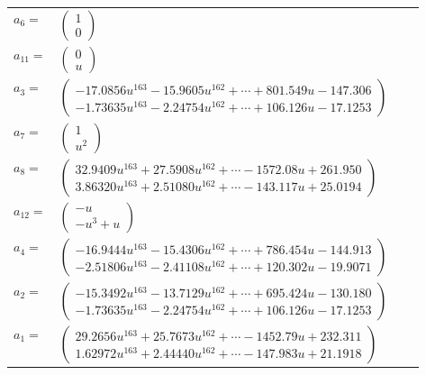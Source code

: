 \documentclass[1p]{elsarticle_modified}
\theoremstyle{definition}
\begin{document}
\begin{tabular}{m{7pt} m{180pt} m{7pt} m{180pt} }
\flushright $a_{6}=$&$\begin{pmatrix}1\\0\end{pmatrix}$ \\
\flushright $a_{11}=$&$\begin{pmatrix}0\\u\end{pmatrix}$ \\
\flushright $a_{3}=$&$\begin{pmatrix}-17.0856 u^{163}-15.9605 u^{162}+\cdots+801.549 u-147.306\\-1.73635 u^{163}-2.24754 u^{162}+\cdots+106.126 u-17.1253\end{pmatrix}$ \\
\flushright $a_{7}=$&$\begin{pmatrix}1\\u^2\end{pmatrix}$ \\
\flushright $a_{8}=$&$\begin{pmatrix}32.9409 u^{163}+27.5908 u^{162}+\cdots-1572.08 u+261.950\\3.86320 u^{163}+2.51080 u^{162}+\cdots-143.117 u+25.0194\end{pmatrix}$ \\
\flushright $a_{12}=$&$\begin{pmatrix}- u\\- u^3+u\end{pmatrix}$ \\
\flushright $a_{4}=$&$\begin{pmatrix}-16.9444 u^{163}-15.4306 u^{162}+\cdots+786.454 u-144.913\\-2.51806 u^{163}-2.41108 u^{162}+\cdots+120.302 u-19.9071\end{pmatrix}$ \\
\flushright $a_{2}=$&$\begin{pmatrix}-15.3492 u^{163}-13.7129 u^{162}+\cdots+695.424 u-130.180\\-1.73635 u^{163}-2.24754 u^{162}+\cdots+106.126 u-17.1253\end{pmatrix}$ \\
\flushright $a_{1}=$&$\begin{pmatrix}29.2656 u^{163}+25.7673 u^{162}+\cdots-1452.79 u+232.311\\1.62972 u^{163}+2.44440 u^{162}+\cdots-147.983 u+21.1918\end{pmatrix}$ \\

\end{tabular}
\end{document}
